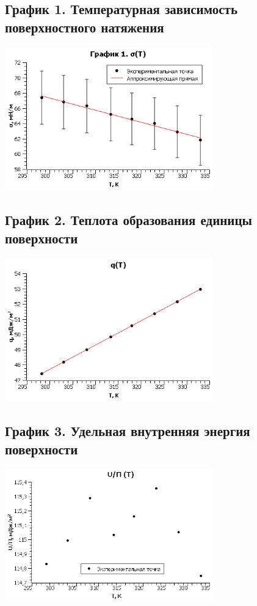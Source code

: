\documentclass[15pt,a5paper,reqno]{article}
\begin{document}
    \subsection{График 1. Температурная зависимость поверхностного натяжения}
    \begin{center}
        \includegraphics[width = 9cm]{График 1.jpg}
    \end{center}
    
    \subsection{График 2. Теплота образования единицы поверхности}
    \begin{center}
        \includegraphics[width = 9cm]{График 2.jpg}
    \end{center}
    
    \subsection{График 3. Удельная внутренняя энергия поверхности}
    \begin{center}
        \includegraphics[width = 9cm]{График 3.jpg}
    \end{center}
\end{document}

